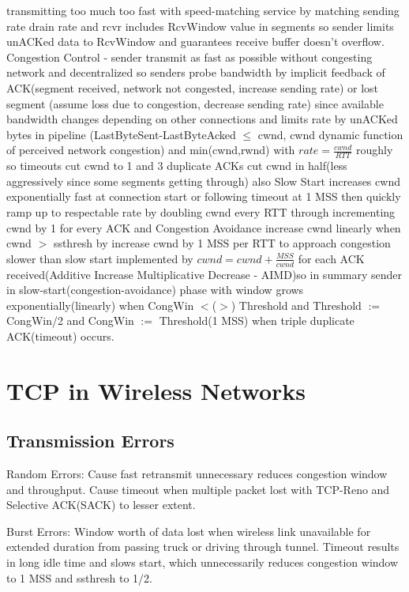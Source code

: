 \documentclass[8pt]{extarticle}
\begin{document}
\begin{multicols}{2}
transmitting too much too fast with speed-matching service by matching sending rate drain rate and rcvr includes RcvWindow value in segments so sender limits unACKed data to RcvWindow and guarantees receive buffer doesn’t overflow. Congestion Control - sender transmit as fast as possible without congesting network and decentralized so senders probe bandwidth by implicit feedback of ACK(segment received, network not congested, increase sending rate) or lost segment (assume loss due to congestion, decrease sending rate) since available bandwidth changes depending on other connections and limits rate by unACKed bytes in pipeline (LastByteSent-LastByteAcked $\leq$ cwnd, cwnd dynamic function of perceived network congestion) and min(cwnd,rwnd) with $rate=\frac{cwnd}{RTT}$ roughly so  timeouts cut cwnd to 1 and 3 duplicate ACKs cut cwnd in half(less aggressively since some segments getting through) also Slow Start increases cwnd exponentially fast at connection start or following timeout at 1 MSS then quickly ramp up to respectable rate by doubling cwnd every RTT through incrementing cwnd by 1 for every ACK and Congestion Avoidance increase cwnd linearly when cwnd $>$ ssthresh by increase cwnd by 1 MSS per RTT to approach congestion slower than slow start implemented by $cwnd=cwnd+\frac{MSS}{cwnd}$ for each ACK received(Additive Increase Multiplicative Decrease - AIMD)so in summary sender in slow-start(congestion-avoidance) phase with window grows exponentially(linearly) when CongWin $<$($>$) Threshold and Threshold $:=$ CongWin/2 and CongWin $:=$ Threshold(1 MSS) when triple duplicate ACK(timeout) occurs.

\section{TCP in Wireless Networks}

\subsection{Transmission Errors}

Random Errors: Cause fast retransmit unnecessary reduces congestion window and throughput. Cause timeout when multiple packet lost with TCP-Reno and Selective ACK(SACK) to lesser extent.

Burst Errors: Window worth of data lost when wireless link unavailable for extended duration from passing truck or driving through tunnel. Timeout results in long idle time and slows start, which unnecessarily reduces congestion window to 1 MSS and ssthresh to 1/2.


\end{multicols}
\end{document}
